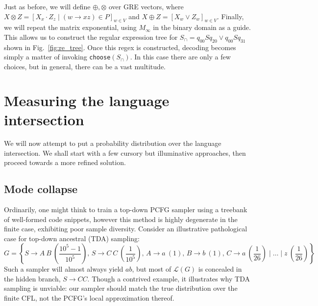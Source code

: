 \documentclass[sigplan,review,acmsmall,nonacm,screen,anonymous]{acmart}\settopmatter{printfolios=false,printccs=false,printacmref=false}
\begin{document}
\enlargethispage{4\baselineskip}
Just as before, we will define $\oplus, \otimes$ over GRE vectors, where $X \otimes Z = [X_x\cdot Z_z \mid (w\rightarrow xz) \in P]_{w\in V}$ and $X \oplus Z= [ X_w\vee Z_w ]_{w\in V}$. Finally, we will repeat the matrix exponential, using $M_\infty$ in the binary domain as a guide. This allows us to construct the regular expression tree for $S_\cap = q_{00}Sq_{20}\vee q_{00}Sq_{31}$ shown in Fig.~\ref{fig:re_tree}. Once this regex is constructed, decoding becomes simply a matter of invoking \texttt{choose}$(S_\cap)$. In this case there are only a few choices, but in general, there can be a vast multitude.

\clearpage

\section{Measuring the language intersection}\label{sec:measurement}

We will now attempt to put a probability distribution over the language intersection. We shall start with a few cursory but illuminative approaches, then proceed towards a more refined solution.

\subsection{Mode collapse}

Ordinarily, one might think to train a top-down PCFG sampler using a treebank of well-formed code snippets, however this method is highly degenerate in the finite case, exhibiting poor sample diversity. Consider an illustrative pathological case for top-down ancestral (TDA) sampling:
$$
G=\left\{ S \rightarrow A\:B \: \left(\frac{10^5 - 1}{10^5}\right), \hspace{2pt}
     S \rightarrow C\:C \: \left(\frac{1}{10^5}\right), \hspace{2pt}
     A \rightarrow a \: (1), \hspace{2pt}
     B  \rightarrow b \: (1), \hspace{2pt}
     C  \rightarrow a \: \left(\frac{1}{26}\right) \mid \ldots \mid z \: \left(\frac{1}{26}\right)\right\}
$$
Such a sampler will almost always yield $a b$, but most of $\mathcal{L}(G)$ is concealed in the hidden branch, $S \rightarrow C C$. Though a contrived example, it illustrates why TDA sampling is unviable: our sampler should match the true distribution over the finite CFL, not the PCFG's local approximation thereof.
\end{document}
